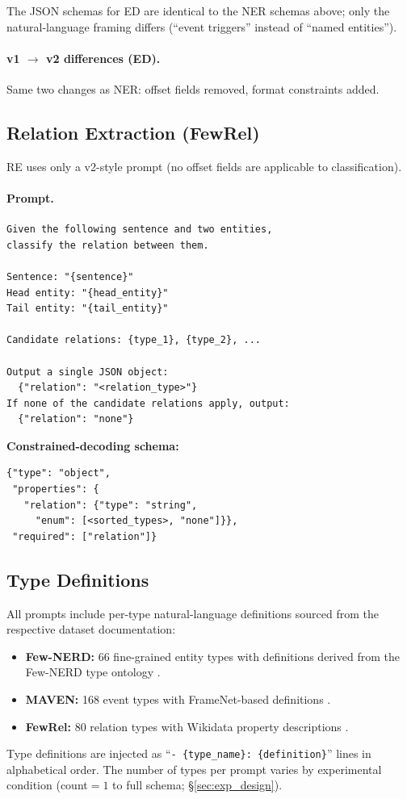 \noindent The JSON schemas for ED are identical to the NER schemas above; only the natural-language framing differs (``event triggers'' instead of ``named entities'').

\paragraph{v1 $\to$ v2 differences (ED).}
Same two changes as NER: offset fields removed, format constraints added.

\subsection{Relation Extraction (FewRel)}

RE uses only a v2-style prompt (no offset fields are applicable to classification).

\paragraph{Prompt.}

\begin{small}
\begin{lstlisting}
Given the following sentence and two entities,
classify the relation between them.

Sentence: "{sentence}"
Head entity: "{head_entity}"
Tail entity: "{tail_entity}"

Candidate relations: {type_1}, {type_2}, ...

Output a single JSON object:
  {"relation": "<relation_type>"}
If none of the candidate relations apply, output:
  {"relation": "none"}
\end{lstlisting}
\end{small}

\noindent
\textbf{Constrained-decoding schema:}
\begin{small}
\begin{lstlisting}
{"type": "object",
 "properties": {
   "relation": {"type": "string",
     "enum": [<sorted_types>, "none"]}},
 "required": ["relation"]}
\end{lstlisting}
\end{small}

\subsection{Type Definitions}
\label{sec:appendix_type_defs}

All prompts include per-type natural-language definitions sourced from the respective dataset documentation:
\begin{itemize}[leftmargin=*,itemsep=2pt]
\item \textbf{Few-NERD:} 66 fine-grained entity types with definitions derived from the Few-NERD type ontology \citep{fewnerd-2021}.
\item \textbf{MAVEN:} 168 event types with FrameNet-based definitions \citep{maven-2020}.
\item \textbf{FewRel:} 80 relation types with Wikidata property descriptions \citep{fewrel-2018}.
\end{itemize}

\noindent Type definitions are injected as ``\texttt{- \{type\_name\}: \{definition\}}'' lines in alphabetical order. The number of types per prompt varies by experimental condition (count${}= 1$ to full schema; \S\ref{sec:exp_design}).
